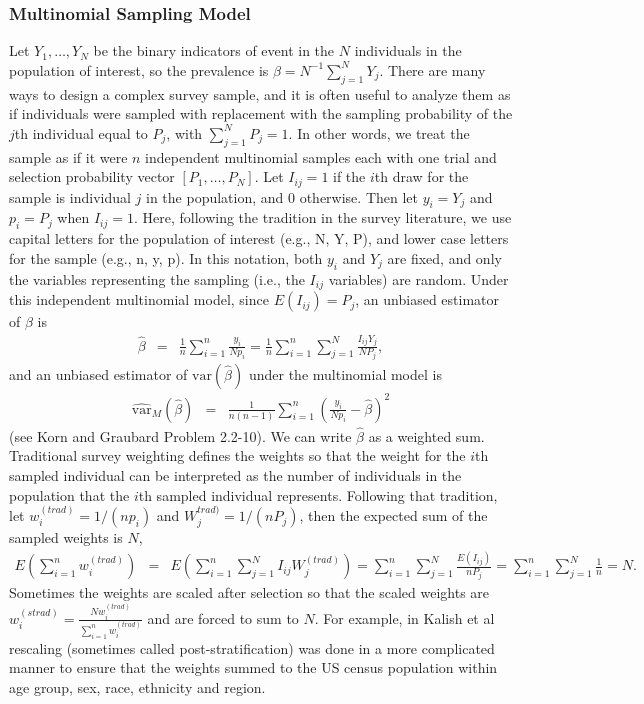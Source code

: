 \subsubsection{Multinomial Sampling Model}
\label{sec-MultPoisson}

Let $Y_1,\ldots, Y_N$ be the binary indicators of event in the $N$ individuals in the population of interest,
so the prevalence is $\beta = N^{-1} \sum_{j=1}^{N} Y_j$. There are many ways to design a complex survey sample, and it is often useful to analyze them as if
individuals were sampled with replacement with the sampling probability of the $j$th individual equal to $P_j$, with $\sum_{j=1}^{N} P_j = 1.$
In other words, we treat the sample as if it were $n$ independent multinomial samples each with one trial and selection probability vector $[P_1,\ldots, P_N]$.
Let $I_{ij}=1$ if the $i$th draw for the sample is individual $j$ in the population, and $0$ otherwise. Then let $y_i = Y_j$ and $p_i=P_j$ when $I_{ij}=1$.
Here, following the tradition in the survey literature, we use capital letters for the population of interest (e.g., N, Y, P), and lower case letters for the sample (e.g., n, y, p).
In this notation, both $y_i$ and $Y_j$ are fixed, and only the variables representing the sampling (i.e., the $I_{ij}$ variables) are random.
Under this independent multinomial model, since $E(I_{ij})=P_j$, an unbiased estimator of $\beta$ is
\begin{eqnarray}
\hat{\beta} & = & \frac{1}{n} \sum_{i=1}^{n} \frac{ y_i}{N p_i} = \frac{1}{n} \sum_{i=1}^{n} \sum_{j=1}^{N} \frac{ I_{ij} Y_j}{N P_j},
\label{eq:betahatMultinomial}
\end{eqnarray}
and an unbiased estimator of $\textrm{var}(\hat{\beta})$ under the multinomial model is
\begin{eqnarray}
\widehat{\textrm{var}}_{M}(\hat{\beta}) & = & \frac{1}{n (n-1)} \sum_{i=1}^{n} \left( \frac{y_i}{Np_i} - \hat{\beta} \right)^2
\label{eq:varMbetahat}
\end{eqnarray}
(see Korn and Graubard\cite{Korn:1999} Problem 2.2-10). We can write $\hat{\beta}$ as a weighted sum. Traditional survey weighting defines the weights so that
the weight for the $i$th sampled individual can be interpreted as the number of individuals in the population that the $i$th sampled individual represents.
Following that tradition, let $w_i^{(trad)}= 1/(np_i)$ and $W_j^{trad)}=1/(nP_j)$, then the expected sum of the sampled weights is $N$,
\begin{eqnarray*}
E \left( \sum_{i=1}^{n} w_i^{(trad)} \right) & = & E \left( \sum_{i=1}^{n} \sum_{j=1}^{N} I_{ij} W_j^{(trad)} \right) = \sum_{i=1}^{n} \sum_{j=1}^{N} \frac{ E(I_{ij})}{ n P_j} = \sum_{i=1}^{n} \sum_{j=1}^{N} \frac{1}{n} = N.
\end{eqnarray*}
Sometimes the weights are scaled after selection so that the scaled weights are $w_i^{(strad)} = \frac{ N w_i^{(trad)} }{\sum_{i=1}^{n} w_i^{(trad)}}$ and are forced to sum to $N$.
For example, in Kalish et al\cite{Kali:2021} rescaling (sometimes called post-stratification) was done in a more complicated manner to ensure that the weights summed to the US census population within age group, sex, race, ethnicity and region.



